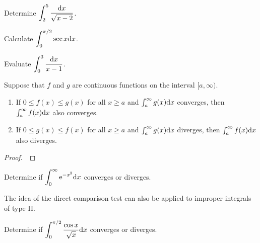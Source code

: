 \begin{example}
Determine $\displaystyle\int_2^5\frac{\mathrm{d} x}{\sqrt{x-2}}$.
\end{example}

\newpage

\begin{example}
Calculate $\displaystyle\int_0^{\pi/2}\sec x\mathrm{d} x$.
\end{example}
\vfill

\begin{example}
Evaluate $\displaystyle\int_0^3\frac{\mathrm{d} x}{x-1}$.
\end{example}
\vfill

\newpage

\begin{theorem}
Suppose that $f$ and $g$ are continuous functions on the interval $[a,\infty)$.
\begin{enumerate}
\item If $0\le f(x)\le g(x)$ for all $x\ge a$ and $\int_a^\infty g(x)\mathrm{d} x$ converges, then $\int_a^\infty f(x)\mathrm{d} x$ also converges.
\item If $0\le g(x)\le f(x)$ for all $x\ge a$ and $\int_a^\infty g(x)\mathrm{d} x$ diverges, then $\int_a^\infty f(x)\mathrm{d} x$ also diverges.
\end{enumerate}
\end{theorem}
\begin{proof}\,

\vspace{5in}
\end{proof}

\newpage


\begin{example}
Determine if $\displaystyle\int_0^\infty \mathrm{e}^{-x^2}\mathrm{d} x$ converges or diverges.
\end{example}

\newpage

\begin{remark}
The idea of the direct comparison test can also be applied to improper integrals of type II.
\end{remark}

\begin{example}
Determine if $\displaystyle\int_0^{\pi/2}\frac{\cos x}{\sqrt x}\mathrm{d} x$ converges or diverges.
\end{example}

\newpage

